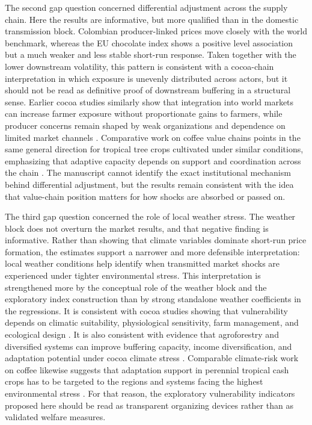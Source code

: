 \documentclass[11pt]{article}
\begin{document}
The second gap question concerned differential adjustment across the supply chain. Here the results are informative, but more qualified than in the domestic transmission block. Colombian producer-linked prices move closely with the world benchmark, whereas the EU chocolate index shows a positive level association but a much weaker and less stable short-run response. Taken together with the lower downstream volatility, this pattern is consistent with a cocoa-chain interpretation in which exposure is unevenly distributed across actors, but it should not be read as definitive proof of downstream buffering in a structural sense. Earlier cocoa studies similarly show that integration into world markets can increase farmer exposure without proportionate gains to farmers, while producer concerns remain shaped by weak organizations and dependence on limited market channels \citep{TsowouGayi2019,Mithofer2017}. Comparative work on coffee value chains points in the same general direction for tropical tree crops cultivated under similar conditions, emphasizing that adaptive capacity depends on support and coordination across the chain \citep{Morales2022,Verburg2019}. The manuscript cannot identify the exact institutional mechanism behind differential adjustment, but the results remain consistent with the idea that value-chain position matters for how shocks are absorbed or passed on.

The third gap question concerned the role of local weather stress. The weather block does not overturn the market results, and that negative finding is informative. Rather than showing that climate variables dominate short-run price formation, the estimates support a narrower and more defensible interpretation: local weather conditions help identify when transmitted market shocks are experienced under tighter environmental stress. This interpretation is strengthened more by the conceptual role of the weather block and the exploratory index construction than by strong standalone weather coefficients in the regressions. It is consistent with cocoa studies showing that vulnerability depends on climatic suitability, physiological sensitivity, farm management, and ecological design \citep{Schroth2016,Lahive2019}. It is also consistent with evidence that agroforestry and diversified systems can improve buffering capacity, income diversification, and adaptation potential under cocoa climate stress \citep{Jacobi2013,Niether2020,Vaast2014}. Comparable climate-risk work on coffee likewise suggests that adaptation support in perennial tropical cash crops has to be targeted to the regions and systems facing the highest environmental stress \citep{Koh2020,Laderach2016}. For that reason, the exploratory vulnerability indicators proposed here should be read as transparent organizing devices rather than as validated welfare measures.
\end{document}
